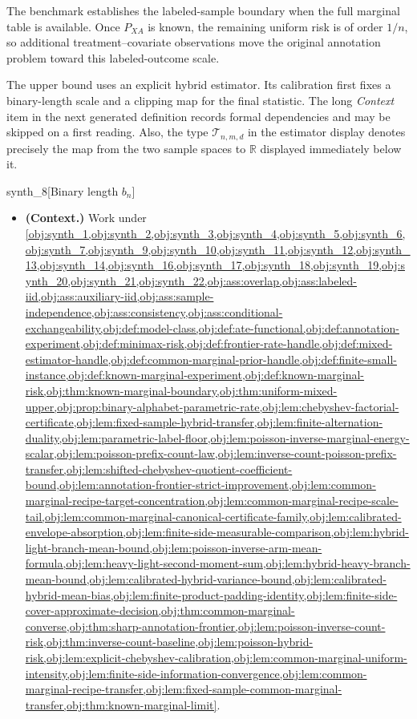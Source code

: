 The benchmark establishes the labeled-sample boundary when the full marginal table is available. Once \(P_{XA}\) is known, the remaining uniform risk is of order \(1/n\), so additional treatment--covariate observations move the original annotation problem toward this labeled-outcome scale.

The upper bound uses an explicit hybrid estimator. Its calibration first fixes a binary-length scale and a clipping map for the final statistic. The long \emph{Context} item in the next generated definition records formal dependencies and may be skipped on a first reading. Also, the type \(\mathcal T_{n,m,d}\) in the estimator display denotes precisely the map from the two sample spaces to \(\mathbb R\) displayed immediately below it.

\begin{definitionv}{synth_8}[Binary length \(b_n\)]
\begin{itemize}
\item \textbf{(Context.)} Work under \cref{obj:synth_1,obj:synth_2,obj:synth_3,obj:synth_4,obj:synth_5,obj:synth_6,obj:synth_7,obj:synth_9,obj:synth_10,obj:synth_11,obj:synth_12,obj:synth_13,obj:synth_14,obj:synth_16,obj:synth_17,obj:synth_18,obj:synth_19,obj:synth_20,obj:synth_21,obj:synth_22,obj:ass:overlap,obj:ass:labeled-iid,obj:ass:auxiliary-iid,obj:ass:sample-independence,obj:ass:consistency,obj:ass:conditional-exchangeability,obj:def:model-class,obj:def:ate-functional,obj:def:annotation-experiment,obj:def:minimax-risk,obj:def:frontier-rate-handle,obj:def:mixed-estimator-handle,obj:def:common-marginal-prior-handle,obj:def:finite-small-instance,obj:def:known-marginal-experiment,obj:def:known-marginal-risk,obj:thm:known-marginal-boundary,obj:thm:uniform-mixed-upper,obj:prop:binary-alphabet-parametric-rate,obj:lem:chebyshev-factorial-certificate,obj:lem:fixed-sample-hybrid-transfer,obj:lem:finite-alternation-duality,obj:lem:parametric-label-floor,obj:lem:poisson-inverse-marginal-energy-scalar,obj:lem:poisson-prefix-count-law,obj:lem:inverse-count-poisson-prefix-transfer,obj:lem:shifted-chebyshev-quotient-coefficient-bound,obj:lem:annotation-frontier-strict-improvement,obj:lem:common-marginal-recipe-target-concentration,obj:lem:common-marginal-recipe-scale-tail,obj:lem:common-marginal-canonical-certificate-family,obj:lem:calibrated-envelope-absorption,obj:lem:finite-side-measurable-comparison,obj:lem:hybrid-light-branch-mean-bound,obj:lem:poisson-inverse-arm-mean-formula,obj:lem:heavy-light-second-moment-sum,obj:lem:hybrid-heavy-branch-mean-bound,obj:lem:calibrated-hybrid-variance-bound,obj:lem:calibrated-hybrid-mean-bias,obj:lem:finite-product-padding-identity,obj:lem:finite-side-cover-approximate-decision,obj:thm:common-marginal-converse,obj:thm:sharp-annotation-frontier,obj:lem:poisson-inverse-count-risk,obj:thm:inverse-count-baseline,obj:lem:poisson-hybrid-risk,obj:lem:explicit-chebyshev-calibration,obj:lem:common-marginal-uniform-intensity,obj:lem:finite-side-information-convergence,obj:lem:common-marginal-recipe-transfer,obj:lem:fixed-sample-common-marginal-transfer,obj:thm:known-marginal-limit}.

\end{itemize}
\end{definitionv}
